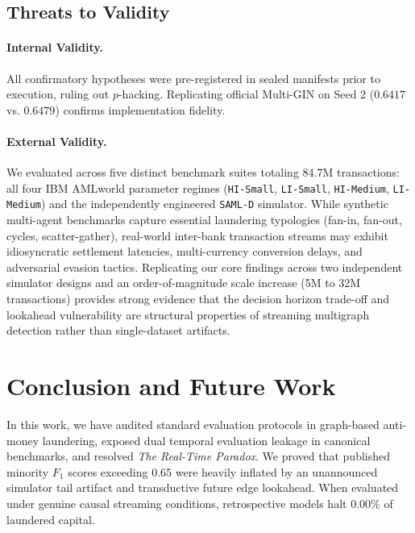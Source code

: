 \documentclass[pdflatex,sn-mathphys,Numbered]{sn-jnl}
\theoremstyle{thmstyleone}
\theoremstyle{thmstyletwo}
\theoremstyle{thmstylethree}
\begin{document}
\subsection{Threats to Validity}
\paragraph{Internal Validity.} All confirmatory hypotheses were pre-registered in sealed manifests prior to execution, ruling out $p$-hacking. Replicating official Multi-GIN on Seed 2 ($0.6417$ vs. $0.6479$) confirms implementation fidelity.
\paragraph{External Validity.} We evaluated across five distinct benchmark suites totaling 84.7M transactions: all four IBM AMLworld parameter regimes (\texttt{HI-Small}, \texttt{LI-Small}, \texttt{HI-Medium}, \texttt{LI-Medium}) and the independently engineered \texttt{SAML-D} simulator. While synthetic multi-agent benchmarks capture essential laundering typologies (fan-in, fan-out, cycles, scatter-gather), real-world inter-bank transaction streams may exhibit idiosyncratic settlement latencies, multi-currency conversion delays, and adversarial evasion tactics. Replicating our core findings across two independent simulator designs and an order-of-magnitude scale increase (5M to 32M transactions) provides strong evidence that the decision horizon trade-off and lookahead vulnerability are structural properties of streaming multigraph detection rather than single-dataset artifacts.

\section{Conclusion and Future Work}
\label{sec:conclusion}

In this work, we have audited standard evaluation protocols in graph-based anti-money laundering, exposed dual temporal evaluation leakage in canonical benchmarks, and resolved \emph{The Real-Time Paradox}. We proved that published minority $F_1$ scores exceeding $0.65$ were heavily inflated by an unannounced simulator tail artifact and transductive future edge lookahead. When evaluated under genuine causal streaming conditions, retrospective models halt $0.00\%$ of laundered capital.
\end{document}
